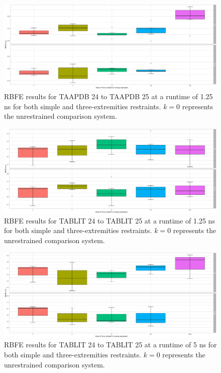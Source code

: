 \documentclass[oneside]{scrreprt}
\begin{document}
\begin{figure}[h]
    \centering
    \includegraphics[width=1\textwidth]{plots/boxplot_rbfe_taapdb_1.25ns.png}
    \caption[RBFE results for TAAPDB 24 to 25]{RBFE results for TAAPDB 24 to TAAPDB 25 at a runtime of 1.25 ns for both simple and three-extremities restraints. $k=0$ represents the unrestrained comparison system.}
    
\end{figure}

\begin{figure}[h]
    \centering
    \includegraphics[width=1\textwidth]{plots/boxplot_rbfe_tablit24to25_1.25ns.png}
    \caption[RBFE results for TABLIT 24 to 25 (1.25ns)]{RBFE results for TABLIT 24 to TABLIT 25 at a runtime of 1.25 ns for both simple and three-extremities restraints. $k=0$ represents the unrestrained comparison system.}
    
\end{figure}

\begin{figure}[h]
    \centering
    \includegraphics[width=1\textwidth]{plots/boxplot_rbfe_tablit24to25_5ns.png}
    \caption[RBFE results for TABLIT 24 to 25 (5ns)]{RBFE results for TABLIT 24 to TABLIT 25 at a runtime of 5 ns for both simple and three-extremities restraints. $k=0$ represents the unrestrained comparison system.}
    
\end{figure}
\end{document}
